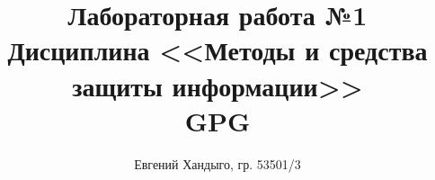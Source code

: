 \documentclass[12pt]{article}
\begin{document}
\title{
    Лабораторная работа №1 \\ 
    Дисциплина <<Методы и средства защиты информации>> \\ 
    GPG}
\author{Евгений Хандыго, гр. 53501/3}

\maketitle
\tableofcontents

\newpage






\end{document}
